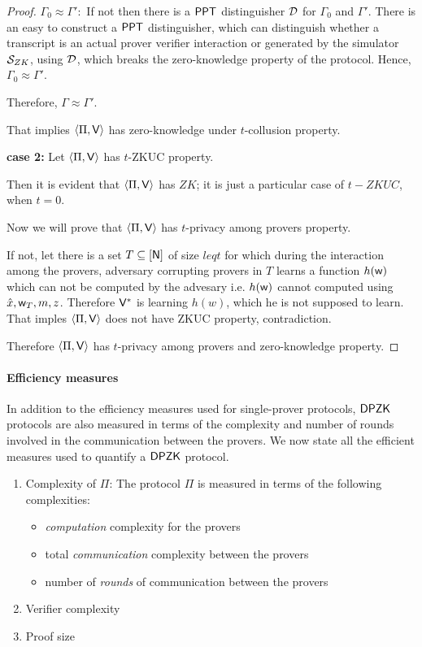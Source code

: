 \begin{proof}
	$\Gamma_0 \approx \Gamma': $ If not then there is a $\mathsf{PPT}$ distinguisher $\mathcal{D}$ for $\Gamma_0$ and $\Gamma'$. There is an easy to construct a $\mathsf{PPT}$ distinguisher, which can distinguish whether a transcript is an actual prover verifier interaction or generated by the simulator $\mathcal{S}_{ZK}$, using $\mathcal{D}$, which breaks the zero-knowledge property of the protocol. Hence, $\Gamma_0 \approx \Gamma'$.
	
	Therefore, $\Gamma \approx \Gamma'$.

That implies $\langle \Pi,\mathsf{V}\rangle$ has zero-knowledge under $t$-collusion property.

\textbf{case 2:} Let $\langle \Pi,\mathsf{V}\rangle$ has $t$-ZKUC property.

Then it is evident that $\langle \Pi,\mathsf{V}\rangle$ has $ZK$; it is just a particular case of $t-ZKUC$, when $t=0$.

Now we will prove that $\langle \Pi,\mathsf{V}\rangle$ has $t$-privacy among provers property. 

If not, let there is a set $T\subseteq [\mathsf{N}]$ of size $leq t$ for which during the interaction among the provers, adversary corrupting provers in $T$ learns a function $h(\mathsf{w})$ which can not be computed by the advesary i.e. $h(\mathsf{w})$ cannot computed using $\hat{x}, \mathsf{w}_T, m, z$. Therefore $\mathsf{V}^*$ is learning $h(w)$, which he is not supposed to learn. That imples $\langle \Pi,\mathsf{V}\rangle$ does not have ZKUC property, contradiction.

Therefore $\langle \Pi,\mathsf{V}\rangle$ has $t$-privacy among provers and zero-knowledge property.
\end{proof}


\paragraph{Efficiency measures}
In addition to the efficiency measures used for single-prover protocols, $\mathsf{DPZK}$ protocols are also measured in terms of the complexity and number of rounds involved in the communication between the provers. We now state all the efficient measures used to quantify a $\mathsf{DPZK}$ protocol.
\begin{enumerate}
\item Complexity of $\Pi$: The protocol $\Pi$ is measured in terms of the following complexities:
\begin{itemize}
\item \textit{computation} complexity for the provers
\item total \textit{communication} complexity between the provers
\item number of \textit{rounds} of communication between the provers
\end{itemize}
\item Verifier complexity
\item Proof size
\end{enumerate}

